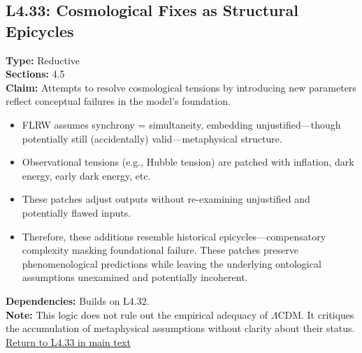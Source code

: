 \documentclass[12pt]{book}
\newcommand{\returnlink}[1]{\hyperref[logic:#1]{Return to #1 in main text}\xspace}
\begin{document}
\subsection*{L4.33: Cosmological Fixes as Structural Epicycles}
\label{appendix:L4.33}
\textbf{Type:} Reductive \\
\textbf{Sections:} 4.5 \\
\textbf{Claim:} Attempts to resolve cosmological tensions by introducing new parameters reflect conceptual failures in the model's foundation.
\begin{itemize}
  \item FLRW assumes synchrony = simultaneity, embedding unjustified---though potentially still (accidentally) valid---metaphysical structure.
  \item Observational tensions (e.g., Hubble tension) are patched with inflation, dark energy, early dark energy, etc.
  \item These patches adjust outputs without re-examining unjustified and potentially flawed inputs.
  \item Therefore, these additions resemble historical epicycles---compensatory complexity masking foundational failure. These patches preserve phenomenological predictions while leaving the underlying ontological assumptions unexamined and potentially incoherent.
\end{itemize}
\textbf{Dependencies:} Builds on L4.32.\\
\textbf{Note:} This logic does not rule out the empirical adequacy of $\Lambda$CDM. It critiques the accumulation of metaphysical assumptions without clarity about their status.\\
\returnlink{L4.33}
\end{document}
